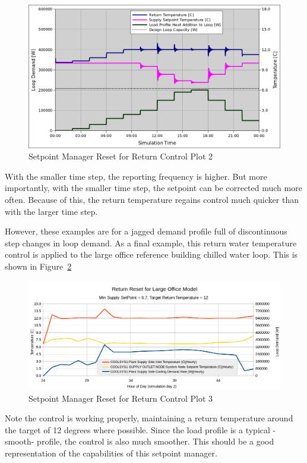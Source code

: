 \begin{figure}[htbp]
\centering
\includegraphics{media/SetPointManager-ResetForReturnControl2.png}
\caption{Setpoint Manager Reset for Return Control Plot 2 \protect \label{fig:key-control-plot2}}
\end{figure}

With the smaller time step, the reporting frequency is higher. But more importantly, with the smaller time step, the setpoint can be corrected much more often. Because of this, the return temperature regains control much quicker than with the larger time step.

However, these examples are for a jagged demand profile full of discontinuous step changes in loop demand. As a final example, this return water temperature control is applied to the large office reference building chilled water loop. This is shown in Figure~\ref{fig:key-control-plot3}

\begin{figure}[htbp]
\centering
\includegraphics{media/SetPointManager-ResetForReturnControl3.png}
\caption{Setpoint Manager Reset for Return Control Plot 3 \protect \label{fig:key-control-plot3}}
\end{figure}

Note the control is working properly, maintaining a return temperature around the target of 12 degrees where possible. Since the load profile is a typical -smooth- profile, the control is also much smoother. This should be a good representation of the capabilities of this setpoint manager.

